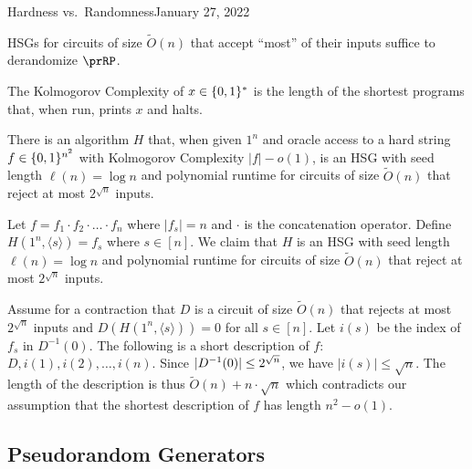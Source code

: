 \begin{lecture}{2}{Hardness vs.\ Randomness}{January 27, 2022}
\begin{theorem}
    HSGs for circuits of size $\widetilde{O}(n)$ that accept ``most'' of their inputs 
    suffice to derandomize $\prRP$.
\end{theorem}


\begin{definition}
    The Kolmogorov Complexity of $x \in \{0, 1\}^*$ is the length of the shortest 
    programs that, when run, prints $x$ and halts.
\end{definition}

\begin{theorem}
    There is an algorithm $H$ that, when given $1^n$ and oracle access to a hard 
    string $f \in \{0, 1\}^{n^2}$ with Kolmogorov Complexity $|f| - o(1)$, is 
    an HSG with seed length $\ell(n) = \log{n}$ and polynomial runtime for circuits 
    of size $\widetilde{O}(n)$ that reject at most $2^{\sqrt{n}}$ inputs.
\end{theorem}

\begin{proofsk}
    Let $f = f_1 \cdot f_2 \cdot \ldots \cdot f_n$ where $|f_s| = n$ and $\cdot$ is the 
    concatenation operator.
    Define $H(1^n, \langle s \rangle) = f_s$ where $s \in [n]$.
    We claim that $H$ is an HSG with seed length $\ell(n) = \log{n}$ and polynomial 
    runtime for circuits of size $\widetilde{O}(n)$ that reject at most $2^{\sqrt{n}}$ 
    inputs.

    Assume for a contraction that $D$ is a circuit of size $\widetilde{O}(n)$ that 
    rejects at most $2^{\sqrt{n}}$ inputs and $D(H(1^n, \langle s \rangle)) = 0$ for 
    all $s \in [n]$.
    Let $i(s)$ be the index of $f_s$ in $D^{-1}(0)$.
    The following is a short description of $f$: $D, i(1), i(2), \dots, i(n)$.
    Since $\lvert D^{-1}(0)\rvert \leq 2^{\sqrt{n}}$, we have $|i(s)| \leq \sqrt{n}$.
    The length of the description is thus $\widetilde{O}(n) + n \cdot \sqrt{n}$ which 
    contradicts our assumption that the shortest description of $f$ has length $n^2 - 
    o(1)$.

\end{proofsk}

\subsection{Pseudorandom Generators}


\end{lecture}
